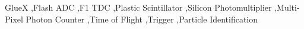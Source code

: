 \begin{keyword}
GlueX \sep Flash ADC \sep F1 TDC \sep Plastic Scintillator \sep Silicon Photomultiplier \sep Multi-Pixel Photon Counter \sep Time of Flight \sep Trigger \sep Particle Identification
\end{keyword}